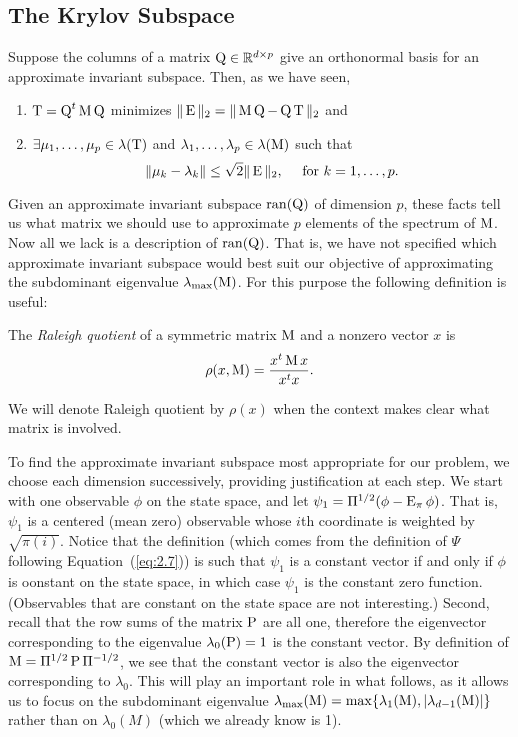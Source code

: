 \subsection{The Krylov Subspace}
\label{sec:krylov-subspace}
Suppose the columns of a matrix $\Q \in \R^{d\times p}$ give an orthonormal
basis for an approximate invariant subspace. Then, as we have seen, 
\begin{enumerate}
\item 
$\T = \Q^t\M\Q$ minimizes $\|\E\|_2 = \|\M\Q - \Q\T\|_2$ and
\item $\exists \mu_1, \dots, \mu_p\in \lambda(\T)$ and 
$\lambda_1,\dots, \lambda_p \in \lambda(\M)$ such that
\[
\|\mu_k-\lambda_k\| \leq \sqrt{2}\|\E\|_2, \quad \text{ for $k=1,\dots, p$.}
\]
\end{enumerate}
%
%
%
%
Given an approximate invariant subspace $\ran(\Q)$ of dimension $p$, these facts
tell us what matrix we should use to approximate $p$ elements of the spectrum of
$\M$. Now all we lack is a description of $\ran(\Q)$. 
That is, we have not specified which approximate invariant subspace would best
suit our objective of approximating the subdominant eigenvalue
$\lambda_{\max}(\M)$. For this purpose the following definition is useful:
\begin{definition}
The \emph{Raleigh quotient} of a symmetric matrix $\M$ and a nonzero vector $x$ is
\[
\rho(x, \M) = \frac{x^t\M x}{x^tx}.
\]
\end{definition}
We will denote Raleigh quotient by $\rho(x)$ when the context makes clear what
matrix is involved. 

To find the approximate invariant subspace most appropriate for our problem, we
choose each dimension successively, providing justification at each step. 
We start with one observable $\phi$ on the state space, and let 
$\psi_1 = \Pi^{1/2}(\phi -\E_\pi\phi)$. That is, $\psi_1$ is a centered (mean
zero) observable whose $i$th coordinate is weighted by $\sqrt{\pi(i)}$. 
Notice that the definition 
(which comes from the definition of $\Psi$ following Equation~(\ref{eq:2.7})) 
is such that $\psi_1$ is a constant vector if and only if $\phi$ is oonstant on the
state space, in which case $\psi_1$ is the constant zero function. 
(Observables that are constant on the state space are not interesting.) 
Second, recall that the row sums of the matrix $\P$ are all one, therefore the
eigenvector corresponding to the eigenvalue $\lambda_0(\P) = 1$ is the constant
vector.  By definition of $\M = \Pi^{1/2}\P\Pi^{-1/2}$, we see that the constant
vector is also the eigenvector corresponding to $\lambda_0$.  This will play an
important role in what follows, as it allows us to focus %
on the subdominant eigenvalue 
$\lambda_{\max}(\M) = \max\{\lambda_1(\M), |\lambda_{d-1}(\M)|\}$
rather than on $\lambda_0(M)$ (which we already know is 1).

